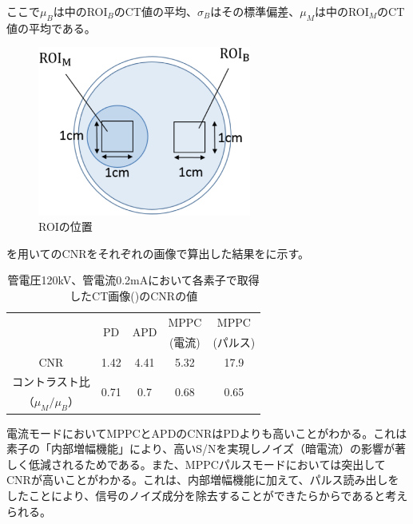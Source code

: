 ここで$\mu_B$は中のROI$_B$のCT値の平均、$\sigma_B$はその標準偏差、$\mu_M$は中のROI$_M$のCT値の平均である。

\begin{figure}[H]
 \begin{center}
 \includegraphics[width=7cm]{image2/chapter5/ROI.eps}
 \end{center}
 \caption{ROIの位置}
 \label{fig:ROI}
\end{figure}

を用いてのCNRをそれぞれの画像で算出した結果をに示す。

\begin{table}[H]
  \centering
    \begin{tabular}{ccccc}
    \toprule
    \multirow{2}[2]{*}{} & \multirow{2}[2]{*}{PD} & \multirow{2}[2]{*}{APD} & MPPC  & MPPC \\
          &       &       & (電流)  & (パルス) \\
    \midrule
    CNR   & 1.42  & 4.41  & 5.32  & 17.9 \\
    コントラスト比 & \multirow{2}[1]{*}{0.71} & \multirow{2}[1]{*}{0.7} & \multirow{2}[1]{*}{0.68} & \multirow{2}[1]{*}{0.65} \\
    （$\mu_M/\mu_B$） &       &       &       &  \\
    \bottomrule
    \end{tabular}%
         \caption{管電圧120kV、管電流0.2mAにおいて各素子で取得したCT画像()のCNRの値}
  \label{tab:cnr}%
\end{table}%

電流モードにおいてMPPCとAPDのCNRはPDよりも高いことがわかる。これは素子の「内部増幅機能」により、高いS/Nを実現しノイズ（暗電流）の影響が著しく低減されるためである。また、MPPCパルスモードにおいては突出してCNRが高いことがわかる。これは、内部増幅機能に加えて、パルス読み出しをしたことにより、信号のノイズ成分を除去することができたらからであると考えられる。

